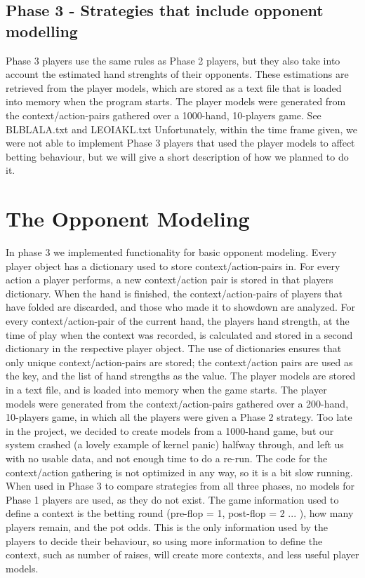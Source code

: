\documentclass[titlepage]{article}
\begin{document}
	\subsection{Phase 3 - Strategies that include opponent modelling}
		Phase 3 players use the same rules as Phase 2 players, but they also take into account the estimated hand strenghts of their opponents. These estimations are retrieved from the player models, which are stored as a text file that is loaded into memory when the program starts. The player models were generated from the context/action-pairs gathered over a 1000-hand, 10-players game. See BLBLALA.txt and LEOIAKL.txt
Unfortunately, within the time frame given, we were not able to implement Phase 3 players that used the player models to affect betting behaviour, but we will give a short description of how we planned to do it.
		
\section{The Opponent Modeling}
    In phase 3 we implemented functionality for basic opponent modeling. Every player object has a dictionary used to store context/action-pairs in. For every action a player performs, a new context/action pair is stored in that players dictionary. When the hand is finished, the context/action-pairs of players that have folded are discarded, and those who made it to showdown are analyzed. For every context/action-pair of the current hand, the players hand strength, at the time of play when the context was recorded, is calculated and stored in a second dictionary in the respective player object. The use of dictionaries ensures that only unique context/action-pairs are stored; the context/action pairs are used as the key, and the list of hand strengths as the value. The player models are stored in a text file, and is loaded into memory when the game starts. The player models were generated from the context/action-pairs gathered over a 200-hand, 10-players game, in which all the players were given a Phase 2 strategy. Too late in the project, we decided to create models from a 1000-hand game, but our system crashed (a lovely example of kernel panic) halfway through, and left us with no usable data, and not enough time to do a re-run. The code for the context/action gathering is not optimized in any way, so it is a bit slow running. When used in Phase 3 to compare strategies from all three phases, no models for Phase 1 players are used, as they do not exist. The game information used to define a context is the betting round (pre-flop = 1, post-flop = 2 ... ), how many players remain, and the pot odds. This is the only information used by the players to decide their behaviour, so using more information to define the context, such as number of raises, will create more contexts, and less useful player models. 
		
\end{document}
